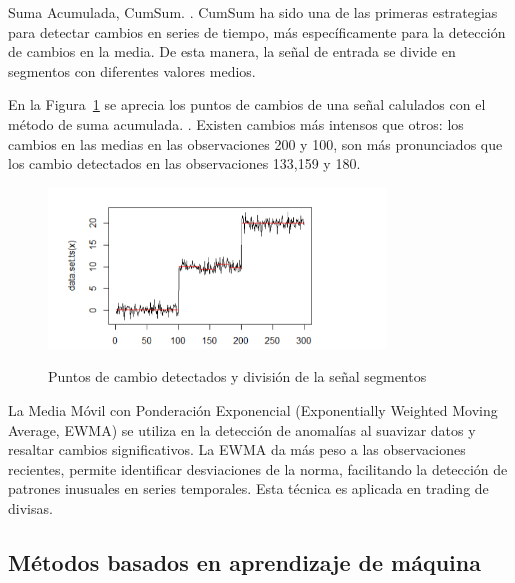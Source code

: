 \documentclass[11pt,a4paper,spanish]{book}
\numberwithin{equation}{chapter}
\numberwithin{figure}{chapter}
\begin{document}
Suma Acumulada, CumSum. \cite{contreras2024cusum}. CumSum ha sido una de las primeras 
estrategias para detectar cambios en series de tiempo, más específicamente para la 
detección de cambios en la media. De esta manera, la señal de entrada se divide en 
segmentos con diferentes valores medios. 


En la Figura~\ref{fig:figPuntosCambiosSegmentos} se aprecia los puntos de cambios de una señal
calulados con el método de suma acumulada.  \citep{contreras2024cusum}. Existen cambios más intensos
que otros: los cambios en las medias en las
observaciones 200 y 100, son más pronunciados que los cambio detectados en las observaciones 
133,159 y 180. 


\begin{figure}[H]
	\caption{Puntos de cambio detectados y división de la señal segmentos \protect\cite{contreras2024cusum}}
    \centering
    \includegraphics[width=0.8\textwidth]{media/puntos-cambios-segmenteos.png}
    \label{fig:figPuntosCambiosSegmentos}
\end{figure}


La Media Móvil con Ponderación Exponencial (Exponentially Weighted Moving Average, EWMA) 
\cite{fan1996ewma} se utiliza en la detección de anomalías al suavizar datos y resaltar 
cambios significativos. La EWMA da más peso a las observaciones recientes, permite 
identificar desviaciones de la norma, facilitando la detección de patrones inusuales en 
series temporales. Esta técnica es aplicada en trading de divisas. 


\subsection{Métodos basados en aprendizaje de máquina}
\end{document}
